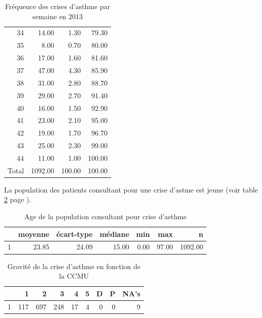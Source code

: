 \documentclass[12pt,english,french,twoside]{report}\usepackage[]{graphicx}\usepackage[]{color}
\begin{document}
\begin{table}[ht]
\begin{tabular}{rrrr}
  34 & 14.00 & 1.30 & 79.30 \\ 
  35 & 8.00 & 0.70 & 80.00 \\ 
  36 & 17.00 & 1.60 & 81.60 \\ 
  37 & 47.00 & 4.30 & 85.90 \\ 
  38 & 31.00 & 2.80 & 88.70 \\ 
  39 & 29.00 & 2.70 & 91.40 \\ 
  40 & 16.00 & 1.50 & 92.90 \\ 
  41 & 23.00 & 2.10 & 95.00 \\ 
  42 & 19.00 & 1.70 & 96.70 \\ 
  43 & 25.00 & 2.30 & 99.00 \\ 
  44 & 11.00 & 1.00 & 100.00 \\ 
    Total & 1092.00 & 100.00 & 100.00 \\ 
   \hline
\end{tabular}
\caption[Fréquence des crises d'asthme]{Fréquence des crises d'asthme par semaine en 2013} 
\label{tab:freq_asthme}
\end{table}




La population des patients consultant pour une crise d'astme est jeune (voir table \ref{tab:age_asthme} page \pageref{tab:age_asthme}).

\begin{table}[ht]
\centering
\begin{tabular}{rrrrrrr}
  \hline
 & moyenne & écart-type & médiane & min & max & n \\ 
  \hline
1 & 23.85 & 24.09 & 15.00 & 0.00 & 97.00 & 1092.00 \\ 
   \hline
\end{tabular}
\caption[Asthme et age]{Age de la population consultant pour crise d'asthme} 
\label{tab:age_asthme}
\end{table}
\begin{table}[ht]
\centering
\begin{tabular}{rrrrrrrrr}
  \hline
 & 1 & 2 & 3 & 4 & 5 & D & P & NA's \\ 
  \hline
1 & 117 & 697 & 248 &  17 &   4 &   0 &   0 &   9 \\ 
   \hline
\end{tabular}
\caption[Asthme et CCMU]{Gravité de la crise d'asthme en fonction de la CCMU} 
\label{tab:ccmu_asthme}
\end{table}
\end{document}
